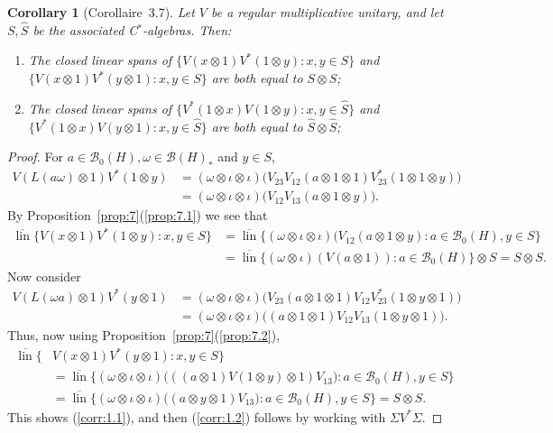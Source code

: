 \documentclass[a4paper,12pt]{article}
\theoremstyle{plain}
\newtheorem{corollary}[proposition]{Corollary}
\theoremstyle{definition}
\newcommand{\mc}{\mathcal}
\newcommand{\lin}{{\operatorname{lin}}}
\begin{document}
\begin{corollary}[Corollaire~3.7]\label{corr:1}
Let $V$ be a regular multiplicative unitary, and let $S,\hat S$ be the
associated C$^*$-algebras.  Then:
\begin{enumerate}
\item\label{corr:1.1} The closed linear spans of
$\{ V(x\otimes 1)V^*(1\otimes y) : x,y\in S \}$
and $\{ V(x\otimes 1)V^*(y\otimes 1) : x,y\in S \}$ are both equal to
$S\otimes S$;
\item\label{corr:1.2} The closed linear spans of
$\{ V^*(1\otimes x)V(1\otimes y) : x,y\in\hat S \}$
and $\{ V^*(1\otimes x)V(y\otimes 1) : x,y\in\hat S \}$ are both equal to
$\hat S\otimes\hat S$;
\end{enumerate}
\end{corollary}
\begin{proof}
For $a\in\mc B_0(H), \omega\in\mc B(H)_*$ and $y\in S$,
\begin{align*}
V(L(a\omega)\otimes 1)V^*(1\otimes y)
&= (\omega\otimes\iota\otimes\iota) \big( V_{23} V_{12}(a\otimes 1\otimes 1)
   V^*_{23}(1\otimes 1\otimes y) \big) \\
&= (\omega\otimes\iota\otimes\iota) \big(V_{12}V_{13}
   (a\otimes 1\otimes y)\big). \end{align*}
By Proposition~\ref{prop:7}(\ref{prop:7.1}) we see that
\begin{align*}
\overline{\lin}\{ V(x\otimes 1)V^*(1\otimes y) : x,y\in S \}
&= \overline{\lin}\{ (\omega\otimes\iota\otimes\iota)
(V_{12}(a\otimes 1\otimes y) : a\in\mc B_0(H), y\in S \} \\
&= \overline{\lin}\{ (\omega\otimes\iota)(V(a\otimes 1)) : a\in\mc B_0(H)
\} \otimes S = S\otimes S. \end{align*}
Now consider
\begin{align*} V(L(\omega a)\otimes 1)V^*(y\otimes 1)
&= (\omega\otimes\iota\otimes\iota)\big( V_{23}(a\otimes 1\otimes 1)
V_{12} V_{23}^* (1\otimes y\otimes 1) \big) \\
&= (\omega\otimes\iota\otimes\iota)\big( (a\otimes 1\otimes 1)
V_{12} V_{13} (1\otimes y\otimes 1) \big). \end{align*}
Thus, now using Proposition~\ref{prop:7}(\ref{prop:7.2}),
\begin{align*}
\overline{\lin}\{ & V(x\otimes 1)V^*(y\otimes 1) : x,y\in S \} \\
&= \overline{\lin}\{ (\omega\otimes\iota\otimes\iota)\big(
( (a\otimes 1)V(1\otimes y) \otimes 1 ) V_{13} \big) : a\in\mc B_0(H),
y\in S \} \\
&= \overline{\lin}\{ (\omega\otimes\iota\otimes\iota)\big(
( a\otimes y\otimes 1 ) V_{13} \big) : a\in\mc B_0(H), y\in S \}
= S\otimes S. \end{align*}
This shows (\ref{corr:1.1}), and then (\ref{corr:1.2}) follows
by working with $\Sigma V^*\Sigma$.
\end{proof}
\end{document}
